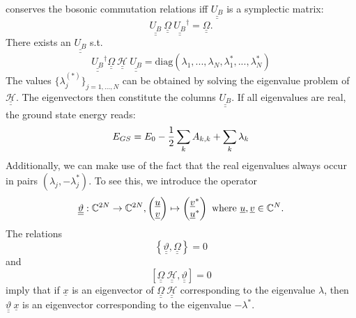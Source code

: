 conserves the bosonic commutation relations iff $\underline{\underline{U_B}}$ is a symplectic matrix:
\begin{equation}\underline{\underline{U_B}}\ {\underline{\underline{\Omega}}}\ \underline{\underline{U_B}}^\dagger={\underline{\underline{\Omega}}}.\end{equation}
There exists an $\underline{\underline{U_B}}$ s.t.
\begin{equation}\label{diagonalization_bog_crux}
\underline{\underline{U_B}}^\dagger {\underline{\underline{\Omega}}}\ {\underline{\underline{\mathscr{H}}}}\ \underline{\underline{U_B}}=\mathrm{diag}\left(\lambda_1,...,\lambda_N,\lambda_1^*,...,\lambda_N^*\right)
\end{equation}
The values $\{\lambda_j^{(*)}\}_{j=1,...,N}$ can be obtained by solving the eigenvalue problem of ${\underline{\underline{\mathscr{H}}}}$. The eigenvectors then constitute the columns $\underline{\underline{U_B}}$. If all eigenvalues are real, the ground state energy reads:
\begin{equation}\label{GS_energy_formula}
E_{GS}=E_0-\frac12\sum\limits_k A_{k,k}+\sum\limits_k \lambda_k
\end{equation}
Additionally, we can make use of the fact that the real eigenvalues always occur in pairs $(\lambda_j,-\lambda_j^*)$. To see this, we introduce the operator \begin{equation}\underline{\underline{\vartheta}}:\C^{2N}\rightarrow \C^{2N},\begin{pmatrix} \underline u\\ \underline v\end{pmatrix}\mapsto \begin{pmatrix} \underline v^*\\ \underline u^*\end{pmatrix}\ \mathrm{where}\ \underline u,\underline v\in\C^N.\end{equation}
The relations 
\begin{equation}\label{theta_Omega_relation}
\left\{\underline{\underline{\vartheta}},{\underline{\underline{\Omega}}}\right\}=0
\end{equation}
and \begin{equation} \left[ {\underline{\underline{\Omega}}}\ {\underline{\underline{\mathscr{H}}}},\underline{\underline{\vartheta}}\right]=0\end{equation}
imply that if $\underline x$ is an eigenvector of ${\underline{\underline{\Omega}}}\ {\underline{\underline{\mathscr{H}}}}$ corresponding to the eigenvalue $\lambda$, then $\underline{\underline{\vartheta}}\ \underline x$ is an eigenvector corresponding to the eigenvalue $-\lambda^*$.
